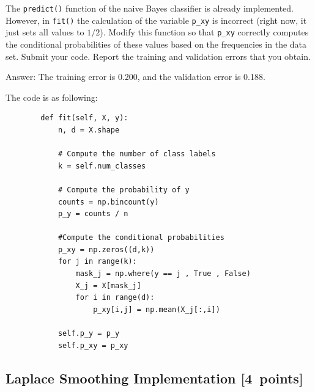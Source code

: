 \documentclass{article}
\newcommand{\blu}[1]{{\textcolor{blu}{#1}}}
\newenvironment{answer}{\par\begingroup\color{gre}Answer: }{\endgroup}
\let\ask\blu
\newcommand\pts[1]{\textcolor{pointscolour}{[#1~points]}}
\begin{document}
    The \texttt{predict()} function of the naive Bayes classifier is already implemented.
    However, in \texttt{fit()}
    the calculation of the variable \texttt{p\_xy} is incorrect
    (right now, it just sets all values to $1/2$).
    \ask{Modify this function so that \texttt{p\_xy} correctly
        computes the conditional probabilities of these values based on the
        frequencies in the data set. Submit your code. Report the training and validation errors that you obtain.}
    \begin{answer}
        The training error is 0.200, and the validation error is 0.188.

        The code is as following:
    \end{answer}


    \begin{verbatim}
        def fit(self, X, y):
            n, d = X.shape

            # Compute the number of class labels
            k = self.num_classes

            # Compute the probability of y
            counts = np.bincount(y)
            p_y = counts / n

            #Compute the conditional probabilities 
            p_xy = np.zeros((d,k))
            for j in range(k):
                mask_j = np.where(y == j , True , False)
                X_j = X[mask_j]
                for i in range(d):
                    p_xy[i,j] = np.mean(X_j[:,i]) 

            self.p_y = p_y
            self.p_xy = p_xy
    \end{verbatim}
    


    \subsection{Laplace Smoothing Implementation \pts{4}}
\end{document}
